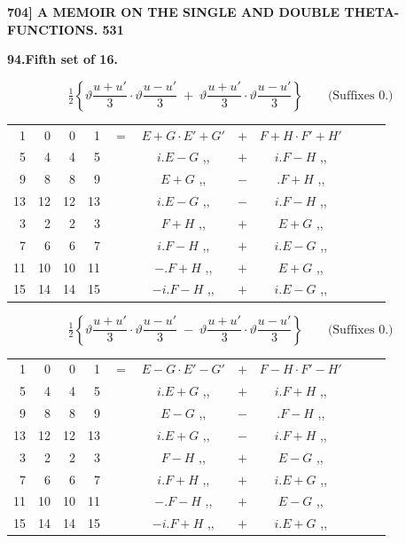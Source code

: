 \documentclass[11pt]{article}
\newcommand{\half}{\tfrac{1}{2}}
\begin{document}
\noindent\textbf{704] \quad A MEMOIR ON THE SINGLE AND DOUBLE THETA-FUNCTIONS. \hfill 531}

\medskip
\begin{center}\textbf{94.\quad Fifth set of 16.}\end{center}

\[
\half\!\left\{\vartheta\frac{u+u'}{3}\cdot\vartheta\frac{u-u'}{3}\;+\;\vartheta\frac{u+u'}{3}\cdot\vartheta\frac{u-u'}{3}\right\}\qquad\text{(Suffixes 0.)}
\]
{\small
\begin{center}
\begin{tabular}{rrrrr@{\ }c@{\ }lcr@{\ }c@{\ }l}
1  & 0  & 0  & 1  & $=$ & $E+G\cdot E'+G'$  & $+$ & $F+H\cdot F'+H'$ \\
5  & 4  & 4  & 5  & & $i.E-G$ \quad ,, & $+$ & $i.F-H$ \quad ,, \\
9  & 8  & 8  & 9  & & $E+G$ \quad ,, & $-$ & $.F+H$ \quad ,, \\
13 & 12 & 12 & 13 & & $i.E-G$ \quad ,, & $-$ & $i.F-H$ \quad ,, \\
3  & 2  & 2  & 3  & & $F+H$ \quad ,, & $+$ & $E+G$ \quad ,, \\
7  & 6  & 6  & 7  & & $i.F-H$ \quad ,, & $+$ & $i.E-G$ \quad ,, \\
11 & 10 & 10 & 11 & & $-.F+H$ \quad ,, & $+$ & $E+G$ \quad ,, \\
15 & 14 & 14 & 15 & & $-i.F-H$ \quad ,, & $+$ & $i.E-G$ \quad ,, \\
\end{tabular}
\end{center}
}

\[
\half\!\left\{\vartheta\frac{u+u'}{3}\cdot\vartheta\frac{u-u'}{3}\;-\;\vartheta\frac{u+u'}{3}\cdot\vartheta\frac{u-u'}{3}\right\}\qquad\text{(Suffixes 0.)}
\]
{\small
\begin{center}
\begin{tabular}{rrrrr@{\ }c@{\ }lcr@{\ }c@{\ }l}
1  & 0  & 0  & 1  & $=$ & $E-G\cdot E'-G'$ & $+$ & $F-H\cdot F'-H'$ \\
5  & 4  & 4  & 5  & & $i.E+G$ \quad ,, & $+$ & $i.F+H$ \quad ,, \\
9  & 8  & 8  & 9  & & $E-G$ \quad ,, & $-$ & $.F-H$ \quad ,, \\
13 & 12 & 12 & 13 & & $i.E+G$ \quad ,, & $-$ & $i.F+H$ \quad ,, \\
3  & 2  & 2  & 3  & & $F-H$ \quad ,, & $+$ & $E-G$ \quad ,, \\
7  & 6  & 6  & 7  & & $i.F+H$ \quad ,, & $+$ & $i.E+G$ \quad ,, \\
11 & 10 & 10 & 11 & & $-.F-H$ \quad ,, & $+$ & $E-G$ \quad ,, \\
15 & 14 & 14 & 15 & & $-i.F+H$ \quad ,, & $+$ & $i.E+G$ \quad ,, \\
\end{tabular}
\end{center}
}
\end{document}
